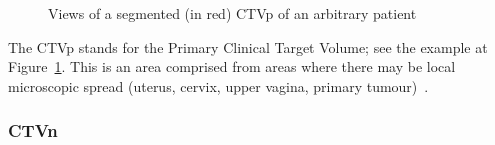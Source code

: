 \documentclass[12pt,twoside]{report}
\begin{document}
\begin{figure}[H]
  \centering
  \caption{Views of a segmented (in red) CTVp of an arbitrary patient}\label{fig:example-CTVp}
\end{figure}

The CTVp stands for the Primary Clinical Target Volume; see the example at Figure~\ref{fig:example-CTVp}. This is an area comprised from areas where there may be local microscopic spread (uterus, cervix, upper vagina, primary tumour)~\cite{AMLART-data}.

\subsubsection{CTVn}\label{sec:data-CTVn}
\end{document}
